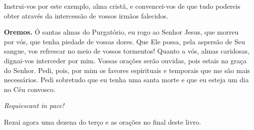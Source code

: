 Instrui-vos por este exemplo, alma cristã, e convencei-vos de que tudo podereis obter através da intercessão de vossos irmãos falecidos.


\vspace{\baselineskip}\noindent \textbf{Oremos.} Ó santas almas do Purgatório, eu rogo ao Senhor Jesus, que morreu por vós, que tenha piedade de vossas dores. Que Ele possa, pela aspersão de Seu sangue, vos refrescar no meio de vossos tormentos! Quanto a vós, almas caridosas, dignai-vos interceder por mim. Vossas orações serão ouvidas, pois estais na graça do Senhor. Pedi, pois, por mim os favores espirituais e temporais que me são mais necessários. Pedi sobretudo que eu tenha uma santa morte e que eu esteja um dia no Céu convosco.



\begin{center}
\textit{Requiescant in pace!}
\end{center}

Rezai agora uma dezena do terço e as orações no final deste livro.
